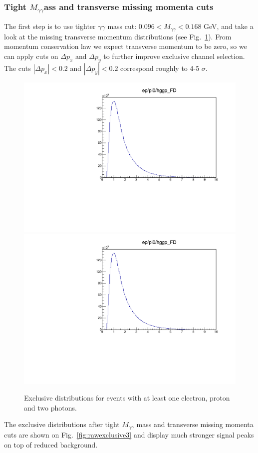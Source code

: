     \subsubsection{Tight \texorpdfstring{$M_{\gamma\gamma} $} mass and transverse missing momenta cuts}
    
    The first step is to use tighter $\gamma\gamma$ mass cut: $0.096<M_{\gamma\gamma}<0.168$ GeV, and take a look at the missing transverse momentum distributions (see Fig.~\ref{fig:ptdistributions}).
    From momentum conservation law we expect transverse momentum to be zero, so we can apply cuts on $\Delta p_x$ and $\Delta p_y$ to further improve exclusive channel selection.
    The cuts $|\Delta p_x|<0.2$ and $|\Delta p_y|<0.2$ correspond roughly to 4-5 $\sigma$.
    
    \begin{figure}[hbt]
    	\centering
    	\includegraphics[page=24,width=0.47\linewidth]{Chapters/Ch4-BaseAnalysis/1_Event_Selection_Cuts/figures/eppi0.exclusive.pdf}
    	\includegraphics[page=25,width=0.47\linewidth]{Chapters/Ch4-BaseAnalysis/1_Event_Selection_Cuts/figures/eppi0.exclusive.pdf}
    	\caption{Exclusive distributions for events with at least one electron, proton and two photons.}
    	\label{fig:ptdistributions}
    \end{figure}
    
    The exclusive distributions after tight $M_{\gamma\gamma}$ mass and transverse missing momenta cuts are shown on Fig.~\ref{fig:rawexclusive3} and display much stronger signal peaks on top of reduced background.
    
